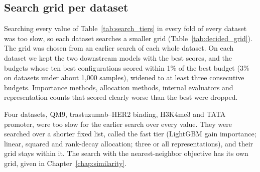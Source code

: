 \subsection{Search grid per dataset}\label{sec:method:decided_grid}
Searching every value of Table~\ref{tab:search_tiers} in every fold of every dataset was too slow, so each dataset searches a smaller grid (Table~\ref{tab:decided_grid}). The grid was chosen from an earlier search of each whole dataset. On each dataset we kept the two downstream models with the best scores, and the budgets whose ten best configurations scored within 1\% of the best budget (3\% on datasets under about 1,000 samples), widened to at least three consecutive budgets. Importance methods, allocation methods, internal evaluators and representation counts that scored clearly worse than the best were dropped.

Four datasets, QM9, trastuzumab--HER2 binding, H3K4me3 and TATA promoter, were too slow for the earlier search over every value. They were searched over a shorter fixed list, called the fast tier (LightGBM gain importance; linear, squared and rank-decay allocation; three or all representations), and their grid stays within it. The search with the nearest-neighbor objective has its own grid, given in Chapter~\ref{chap:similarity}.

